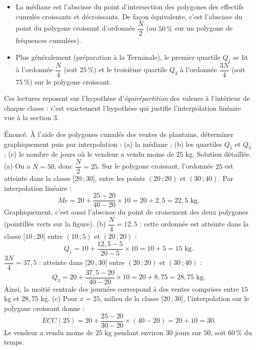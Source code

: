 \documentclass[11pt]{article}
\newcommand{\cle}[1]{{\popxbold\color{popdark}#1}}
\begin{document}
\begin{propriete}
\begin{itemize}
\item La \cle{médiane} est l'abscisse du point d'intersection des polygones des effectifs cumulés croissants et décroissants. De façon équivalente, c'est l'abscisse du point du polygone croissant d'ordonnée $\dfrac{N}{2}$ (ou $50\,\%$ sur un polygone de fréquences cumulées).
\item Plus généralement (préparation à la Terminale), le \cle{premier quartile} $Q_1$ se lit à l'ordonnée $\dfrac{N}{4}$ (soit $25\,\%$) et le \cle{troisième quartile} $Q_3$ à l'ordonnée $\dfrac{3N}{4}$ (soit $75\,\%$) sur le polygone croissant.
\end{itemize}
Ces lectures reposent sur l'hypothèse d'\emph{équirépartition} des valeurs à l'intérieur de chaque classe : c'est exactement l'hypothèse qui justifie l'interpolation linéaire vue à la section 3.
\end{propriete}

\begin{exoresolu}
Énoncé. À l'aide des polygones cumulés des ventes de plantains, déterminer graphiquement puis par interpolation : (a) la médiane ; (b) les quartiles $Q_1$ et $Q_3$ ; (c) le nombre de jours où le vendeur a vendu moins de $25$ kg.
\tcblower
Solution détaillée.
(a) On a $N = 50$, donc $\dfrac{N}{2} = 25$. Sur le polygone croissant, l'ordonnée $25$ est atteinte dans la classe $[20\,;30[$, entre les points $(20\,;20)$ et $(30\,;40)$. Par interpolation linéaire :
\[ Me = 20 + \dfrac{25 - 20}{40 - 20}\times 10 = 20 + 2{,}5 = 22{,}5 \text{ kg}. \]
Graphiquement, c'est aussi l'abscisse du point de croisement des deux polygones (pointillés verts sur la figure).
(b) $\dfrac{N}{4} = 12{,}5$ : cette ordonnée est atteinte dans la classe $[10\,;20[$ entre $(10\,;5)$ et $(20\,;20)$ :
\[ Q_1 = 10 + \dfrac{12{,}5 - 5}{20 - 5}\times 10 = 10 + 5 = 15 \text{ kg}. \]
$\dfrac{3N}{4} = 37{,}5$ : atteinte dans $[20\,;30[$ entre $(20\,;20)$ et $(30\,;40)$ :
\[ Q_3 = 20 + \dfrac{37{,}5 - 20}{40 - 20}\times 10 = 20 + 8{,}75 = 28{,}75 \text{ kg}. \]
Ainsi, la moitié centrale des journées correspond à des ventes comprises entre $15$ kg et $28{,}75$ kg.
(c) Pour $x = 25$, milieu de la classe $[20\,;30[$, l'interpolation sur le polygone croissant donne :
\[ ECC(25) = 20 + \dfrac{25 - 20}{30 - 20}\times(40 - 20) = 20 + 10 = 30. \]
Le vendeur a vendu moins de $25$ kg pendant environ $30$ jours sur $50$, soit $60\,\%$ du temps.
\end{exoresolu}
\end{document}
